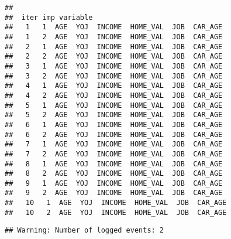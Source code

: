 \documentclass[]{article}
\begin{document}
\begin{verbatim}
## 
##  iter imp variable
##   1   1  AGE  YOJ  INCOME  HOME_VAL  JOB  CAR_AGE
##   1   2  AGE  YOJ  INCOME  HOME_VAL  JOB  CAR_AGE
##   2   1  AGE  YOJ  INCOME  HOME_VAL  JOB  CAR_AGE
##   2   2  AGE  YOJ  INCOME  HOME_VAL  JOB  CAR_AGE
##   3   1  AGE  YOJ  INCOME  HOME_VAL  JOB  CAR_AGE
##   3   2  AGE  YOJ  INCOME  HOME_VAL  JOB  CAR_AGE
##   4   1  AGE  YOJ  INCOME  HOME_VAL  JOB  CAR_AGE
##   4   2  AGE  YOJ  INCOME  HOME_VAL  JOB  CAR_AGE
##   5   1  AGE  YOJ  INCOME  HOME_VAL  JOB  CAR_AGE
##   5   2  AGE  YOJ  INCOME  HOME_VAL  JOB  CAR_AGE
##   6   1  AGE  YOJ  INCOME  HOME_VAL  JOB  CAR_AGE
##   6   2  AGE  YOJ  INCOME  HOME_VAL  JOB  CAR_AGE
##   7   1  AGE  YOJ  INCOME  HOME_VAL  JOB  CAR_AGE
##   7   2  AGE  YOJ  INCOME  HOME_VAL  JOB  CAR_AGE
##   8   1  AGE  YOJ  INCOME  HOME_VAL  JOB  CAR_AGE
##   8   2  AGE  YOJ  INCOME  HOME_VAL  JOB  CAR_AGE
##   9   1  AGE  YOJ  INCOME  HOME_VAL  JOB  CAR_AGE
##   9   2  AGE  YOJ  INCOME  HOME_VAL  JOB  CAR_AGE
##   10   1  AGE  YOJ  INCOME  HOME_VAL  JOB  CAR_AGE
##   10   2  AGE  YOJ  INCOME  HOME_VAL  JOB  CAR_AGE
\end{verbatim}

\begin{verbatim}
## Warning: Number of logged events: 2
\end{verbatim}
\end{document}
